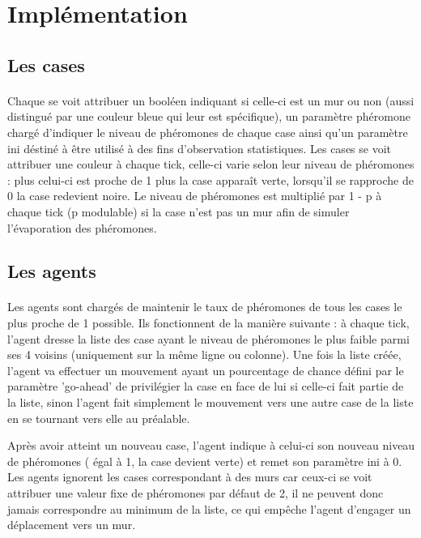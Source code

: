 \documentclass{article}
\begin{document}
\section{Implémentation}
    \subsection{Les cases}
\paragraph{}Chaque se voit attribuer un booléen indiquant si celle-ci est un mur ou non (aussi distingué par 
une couleur bleue qui leur est spécifique), un paramètre phéromone chargé d'indiquer le niveau de phéromones 
de chaque case ainsi qu'un paramètre ini déstiné à être utilisé à des fins d'observation statistiques.
Les cases se voit attribuer une couleur à chaque tick, celle-ci varie selon leur niveau de phéromones :
plus celui-ci est proche de 1 plus la case apparaît verte, lorsqu'il se rapproche de 0 la case redevient noire. 
Le niveau de phéromones est multiplié par 1 - p à chaque tick (p modulable) si la case n'est pas un mur afin 
de simuler l'évaporation des phéromones.
      
    \subsection{Les agents}
\paragraph{}Les agents sont chargés de maintenir le taux de phéromones de tous les cases le plus proche de 1 possible.
Ils fonctionnent de la manière suivante : à chaque tick, l'agent dresse la liste des case ayant le niveau 
de phéromones le plus faible parmi ses 4 voisins (uniquement sur la même ligne ou colonne). Une fois la liste
 créée, l'agent va effectuer un mouvement ayant un pourcentage de chance défini par le paramètre 'go-ahead' 
 de privilégier la case en face de lui si celle-ci fait partie de la liste, sinon l'agent fait simplement le 
 mouvement vers une autre case de la liste en se tournant vers elle au préalable.

Après avoir atteint un nouveau case, l'agent indique à celui-ci son nouveau niveau de phéromones ( égal à 1, 
la case devient verte) et remet son paramètre ini à 0. Les agents ignorent les cases correspondant à des murs 
car ceux-ci se voit attribuer une valeur fixe de phéromones par défaut de 2, il ne peuvent donc jamais correspondre 
au minimum de la liste, ce qui empêche l'agent d'engager un déplacement vers un mur.
\end{document}
